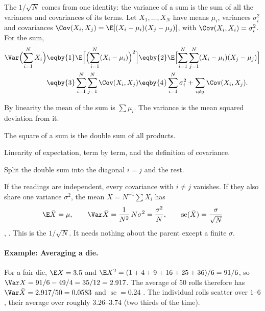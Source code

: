 The $1/\sqrt N$ comes from one identity: the variance of a sum is the sum of
all the variances and covariances of its terms. Let $X_1,\dots,X_N$ have
means $\mu_i$, variances $\sigma_i^2$ and covariances
$\Cov(X_i,X_j)=\E[(X_i-\mu_i)(X_j-\mu_j)]$, with $\Cov(X_i,X_i)=\sigma_i^2$.
For the sum,
\begin{align}
  \Var\Bigl(\sum_{i=1}^NX_i\Bigr)
  &\eqby{1} \E\Bigl[\Bigl(\sum_{i=1}^N(X_i-\mu_i)\Bigr)^2\Bigr]
   \eqby{2} \E\Bigl[\sum_{i=1}^N\sum_{j=1}^N(X_i-\mu_i)(X_j-\mu_j)\Bigr] \nonumber\\
  &\eqby{3} \sum_{i=1}^N\sum_{j=1}^N\Cov(X_i,X_j)
   \eqby{4} \sum_{i=1}^N\sigma_i^2+\sum_{i\neq j}\Cov(X_i,X_j) .
  \label{3a:eq:var-sum}
\end{align}
\begin{explain}
  \item By linearity the mean of the sum is $\sum\mu_i$. The variance is the
        mean squared deviation from it.
  \item The square of a sum is the double sum of all products.
  \item Linearity of expectation, term by term, and the definition of covariance.
  \item Split the double sum into the diagonal $i=j$ and the rest.
\end{explain}
If the readings are independent, every covariance with $i\neq j$ vanishes.
If they also share one variance $\sigma^2$, the mean $\bar X=N^{-1}\sum X_i$
has
\begin{equation}
  \E\bar X=\mu,\qquad
  \Var\bar X=\frac1{N^2}\,N\sigma^2=\frac{\sigma^2}{N},\qquad
  \operatorname{se}(\bar X)=\frac{\sigma}{\sqrt N}
  \label{3a:eq:var-mean}
\end{equation}
, . This is the
$1/\sqrt N$. It needs nothing about the parent except a finite $\sigma$.

\paragraph{Example: Averaging a die.}
\label{3a:ex:dice}
For a fair die, $\E X=3.5$ and $\E X^2=(1+4+9+16+25+36)/6=91/6$, so
$\Var X=91/6-49/4=35/12=2.917$. The average of $50$ rolls therefore has
$\Var\bar X=2.917/50=0.0583$ and $\operatorname{se}=0.24$
. The individual rolls scatter over
$1$--$6$, their average over roughly $3.26$--$3.74$ (two thirds of the time).

